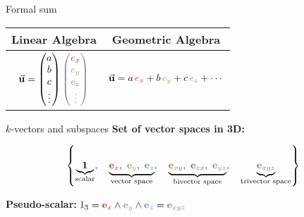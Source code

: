 \begin{frame}{Formal sum}
    \large
    \begin{center}
        \renewcommand{\arraystretch}{2.0} %
        \begin{tabular}{|c|c|}
            \hline
            \textbf{Linear Algebra} & \textbf{Geometric Algebra} \\ \hline
            $\vec{\mathbf{u}} =
                \begin{pmatrix}
                    a \\
                    b \\
                    c \\
                    \vdots
                \end{pmatrix}
                \textcolor{gray}{
                    \begin{pmatrix}
                        \textcolor{red}{e_x}   \\
                        \textcolor{green}{e_y} \\
                        \textcolor{blue}{e_z}  \\
                        \vdots
                    \end{pmatrix}
                }$
                                    &
            $\vec{\mathbf{u}} = a\, \textcolor{red}{e_x} + b\, \textcolor{green}{e_y} + c\, \textcolor{blue}{e_z} + \cdots$
            \\ \hline
        \end{tabular}
    \end{center}
\end{frame}









\begin{frame}{$k$-vectors and subspaces}
    \textbf{Set of vector spaces in 3D:}

    \vspace{1em}

    \[
        \left\{
        \underbrace{\mathbf{1}}_{\text{scalar}},\quad
        \underbrace{
            \textcolor{red}{\mathbf{e}_x},\
            \textcolor{green}{\mathbf{e}_y},\
            \textcolor{blue}{\mathbf{e}_z}
        }_{\text{vector space}},\quad
        \underbrace{
            \textcolor{midredgreen}{\mathbf{e}_{xy}},\
            \textcolor{midredblue}{\mathbf{e}_{zx}},\
            \textcolor{midgreenblue}{\mathbf{e}_{yz}}
        }_{\text{bivector space}},\quad
        \underbrace{
            \textcolor{mixAll}{\mathbf{e}_{xyz}}
        }_{\text{trivector space}}
        \right\}
    \]

    \vspace{1em}

    \textbf{Pseudo-scalar: }
    \(
    \textcolor{mixAll}{\mathbf{I}}_3 =
    \textcolor{red}{\mathbf{e}_x} \wedge
    \textcolor{green}{\mathbf{e}_y} \wedge
    \textcolor{blue}{\mathbf{e}_z} =
    \textcolor{mixAll}{\mathbf{e}_{xyz}}
    \)
\end{frame}




